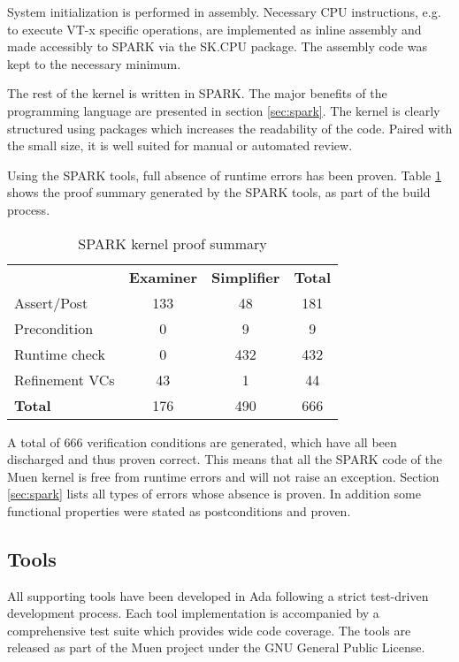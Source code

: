 System initialization is performed in assembly. Necessary CPU instructions,
e.g. to execute VT-x specific operations, are implemented as inline assembly
and made accessibly to SPARK via the SK.CPU package. The assembly code was
kept to the necessary minimum.

The rest of the kernel is written in SPARK. The major benefits of the
programming language are presented in section \ref{sec:spark}. The kernel is
clearly structured using packages which increases the readability of the code.
Paired with the small size, it is well suited for manual or automated review.

Using the SPARK tools, full absence of runtime errors has been proven. Table
\ref{tab:kernel-proof-sum} shows the proof summary generated by the SPARK tools,
as part of the build process.

\begin{table}[h]
	\centering
	\begin{tabular}{l c c c}
		& \textbf{Examiner} & \textbf{Simplifier} & \textbf{Total} \\
		Assert/Post    & 133 & 48  & 181 \\
		Precondition   & 0   & 9   & 9   \\
		Runtime check  & 0   & 432 & 432 \\
		Refinement VCs & 43  & 1   & 44 \\
		\hline
		\textbf{Total} & 176 & 490 & 666 \\
	\end{tabular}
	\caption{SPARK kernel proof summary}
	\label{tab:kernel-proof-sum}
\end{table}

A total of 666 verification conditions are generated, which have all been
discharged and thus proven correct. This means that all the SPARK code of the
Muen kernel is free from runtime errors and will not raise an exception.
Section \ref{sec:spark} lists all types of errors whose absence is proven. In
addition some functional properties were stated as postconditions and proven.

\subsection{Tools}
All supporting tools have been developed in Ada following a strict test-driven
development process. Each tool implementation is accompanied by a comprehensive
test suite which provides wide code coverage. The tools are released as part of
the Muen project under the GNU General Public License.

